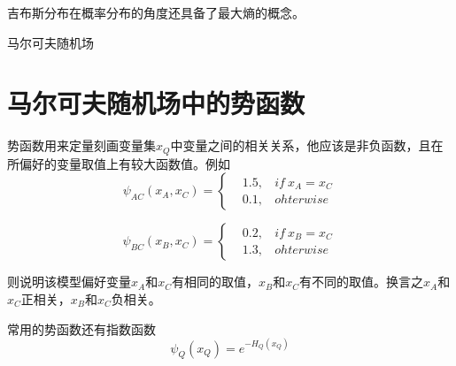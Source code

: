 吉布斯分布在概率分布的角度还具备了最大熵的概念。

马尔可夫随机场

\section{马尔可夫随机场中的势函数}

势函数用来定量刻画变量集$x_Q$中变量之间的相关关系，他应该是非负函数，且在所偏好的变量取值上有较大函数值。例如
\begin{equation}
    \psi_{AC}(x_A,x_C)=
    \begin{cases}
        & 1.5,\ \ \ \ if\ x_A=x_C\\
        & 0.1,\ \ \ \ ohterwise
    \end{cases}
    \nonumber
\end{equation}

\begin{equation}
    \psi_{BC}(x_B,x_C)=
    \begin{cases}
        & 0.2,\ \ \ \ if\ x_B=x_C\\
        & 1.3,\ \ \ \ ohterwise
    \end{cases}
    \nonumber
\end{equation}

则说明该模型偏好变量$x_A$和$x_C$有相同的取值，$x_B$和$x_C$有不同的取值。换言之$x_A$和$x_C$正相关，$x_B$和$x_C$负相关。

常用的势函数还有指数函数
\begin{equation}
    \psi_Q(x_Q)=e^{-H_Q(x_Q)}
\end{equation}